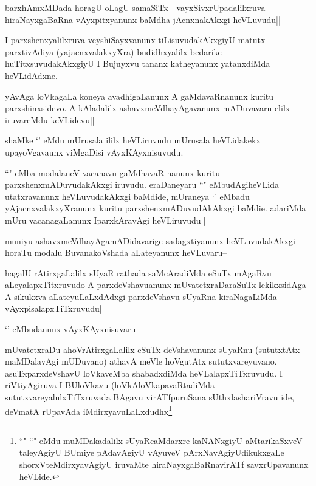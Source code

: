 \begin{artha}
barxhAmxMDada horagU oLagU samaSiTx - vayxSivxrUpadalilxruva hiraNayxgaBaRna vAyxpitxyanunx baMdha jAcnxnakAkxgi heVLuvudu||
\end{artha}


\begin{artha}
I parxshenxyalilxruva veyshiSayxvanunx tiLisuvudakAkxgiyU matutx parxtivAdiya (yajacnxvalakxyXra) budidhxyalilx bedarike huTitxsuvudakAkxgiyU I Bujuyxvu tananx katheyanunx yatanxdiMda heVLidAdxne.
\end{artha}

\begin{artha}
yAvAga loVkagaLa koneya avadhigaLanunx A gaMdavaRnanunx kuritu parxshinxsidevo. A kAladalilx ashavxmeVdhayAgavanunx mADuvavaru elilx iruvareMdu keVLidevu||
\end{artha}

\begin{artha}
shaMke `\stext' eMdu mUrusala ililx heVLiruvudu mUrusala heVLidakekx upayoVgavaunx viMgaDisi vAyxKAyxnisuvudu.
\end{artha}

\begin{artha}
``\stext" eMba modalaneV vacanavu gaMdhavaR nanunx kuritu parxshenxmADuvudakAkxgi iruvudu. eraDaneyaru ``\stext" eMbudAgiheVLida utatxravanunx heVLuvudakAkxgi baMdide, mUraneya `\stext' eMbadu yAjacnxvalakxyXranunx kuritu parxshenxmADuvudAkAkxgi baMdie. adariMda mUru vacanagaLanunx IparxkAravAgi heVLiruvudu||
\end{artha}

\begin{artha}
muniyu ashavxmeVdhayAgamADidavarige sadagxtiyanunx heVLuvudakAkxgi horaTu modalu BuvanakoVshada aLateyanunx heVLuvaru--
\end{artha}

\begin{artha}
hagalU rAtirxgaLalilx sUyaR rathada saMcAradiMda eSuTx mAgaRvu aLeyalapxTitxruvudo A parxdeVshavuanunx mUvatetxraDaraSuTx lekikxsidAga A sikukxva aLateyuLaLxdAdxgi parxdeVshavu sUyaRna kiraNagaLiMda vAyxpisalapxTiTxruvudu||
\end{artha}

\begin{artha}
`\stext' eMbudanunx vAyxKAyxnisuvaru---
\end{artha}

\begin{artha}
mUvatetxraDu ahoVrAtirxgaLalilx eSuTx deVshavanunx sUyaRnu (sututxtAtx maMDalavAgi mUDuvano) athavA meVle hoVgutAtx sututxvareyuvano. asuTxparxdeVshavU loVkaveMba shabadxdiMda heVLalapxTiTxruvudu. I riVtiyAgiruva I BUloVkavu (loVkAloVkapavaRtadiMda sututxvareyalulxTiTxruvada BAgavu virATfpuruSana sUthxlashariVravu ide, deVmatA rUpavAda iMdirxyavuLaLxdudhx\footnote{``\stext" ``\stext" eMdu muMDakadalilx sUyaRcaMdarxre kaNANxgiyU aMtarikaSxveV taleyAgiyU BUmiye pAdavAgiyU vAyuveV pArxNavAgiyUdikukxgaLe shorxVteMdirxyavAgiyU iruvaMte hiraNayxgaBaRnavirATf savxrUpavanunx heVLide.}
\end{artha}

